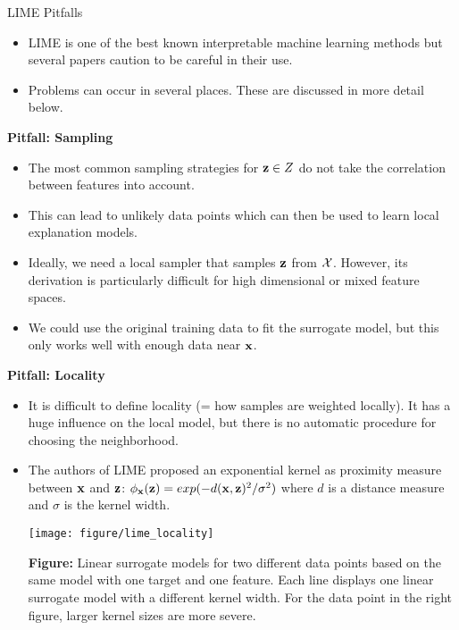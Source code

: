 \documentclass[11pt,compress,t,notes=noshow, aspectratio=169, xcolor=table]{beamer}
\begin{document}
\begin{vbframe}[allowframebreaks]{LIME Pitfalls}
  \begin{itemize}
  	\item LIME is one of the best known interpretable machine learning methods but several papers caution to be careful in their use. 
  	\item Problems can occur in several places. These are discussed in more detail below. 
  \end{itemize}
	\textbf{Pitfall: Sampling}
	\begin{itemize}
	  \item The most common sampling strategies for $\mathbf{z} \in Z$ do not take the correlation between features into account. 
      \item This can lead to unlikely data points which can then be used to learn local explanation models.
      \item Ideally, we need a local sampler that samples $\mathbf{z}$ from $\mathcal{X}$. However, its derivation is particularly difficult for high dimensional or mixed feature spaces. 
      \item We could use the original training data to fit the surrogate model, but this only works well with enough data near $\mathbf{x}$.
    \end{itemize}
\framebreak
	\textbf{Pitfall: Locality}
	\begin{itemize} 
     \item It is difficult to define locality (= how samples are weighted locally). It has a huge influence on the local model, but there is no automatic procedure for choosing the neighborhood.
     \item The authors of LIME proposed an exponential kernel as proximity measure between $\mathbf{x}$ and $\mathbf{z}$:
     	$\phi_{\mathbf{x}}(\mathbf{z}) = exp(-d(\mathbf{x}, \mathbf{z})^2/\sigma^2)$ where $d$ is a distance measure and $\sigma$ is the kernel width. 
     	 \begin{center}
     		\texttt{[image: figure/lime\_locality]}
     		\vspace{-0.5cm}
     		
     		\scriptsize{\textbf{Figure:} Linear surrogate models for two different data points based on the same model with one target and one feature. Each line displays one linear surrogate model with a different kernel width. For the data point in the right figure, larger kernel sizes are more severe.}
     		

\end{center}
\end{itemize}
\end{vbframe}
\end{document}
